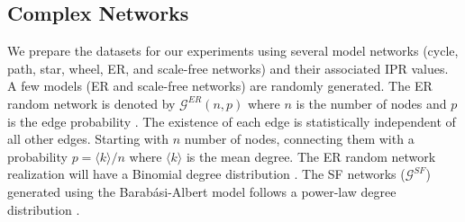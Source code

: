 \documentclass[aps, prd, showpacs, floatfix, superscriptaddress, twocolumn, nofootinbib, preprintnumbers, longbibliography]{revtex4-2}
\begin{document}
\subsection{Complex Networks}
We prepare the datasets for our experiments using several model networks (cycle, path, star, wheel, ER, and scale-free networks) and their associated IPR values. A few models (ER and scale-free networks) are randomly generated. The ER random network is denoted by $\mathcal{G}^{ER}(n,p)$ where $n$ is the number of nodes and $p$ is the edge probability \cite{posfai2016network}. The existence of each edge is statistically independent of all other edges. Starting with $n$ number of nodes, connecting them with a probability $p = \langle k \rangle / n$ where $\langle k \rangle$ is the mean degree. The ER random network realization will have a Binomial degree distribution \cite{posfai2016network}. The SF networks ($\mathcal{G}^{SF}$) generated using the Barab{\' a}si-Albert model follows a power-law degree distribution \cite{posfai2016network}.









\end{document}
